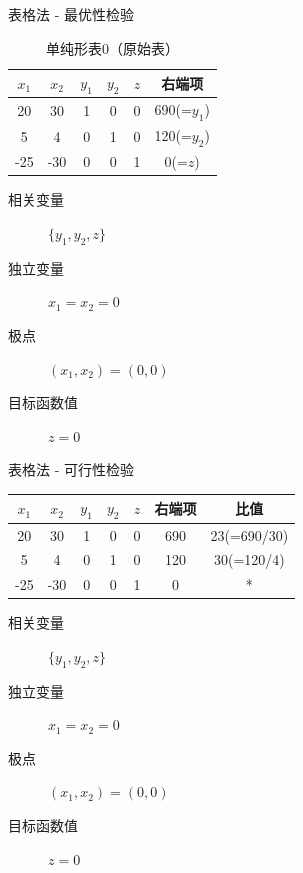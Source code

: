 \documentclass[UTF8]{ctexbeamer}
\begin{document}
\begin{frame}{表格法 - 最优性检验}

  \begin{table}
    \centering
    \begin{tabular}{|ccccc|c|}
      \hline
      $x_1$ & {\color{red}$x_2$} & $y_1$ & $y_2$ & $z$ & 右端项 \\
      \hline
      20 & 30 & 1 & 0 & 0 & 690(=$y_1$)\\
      5 & 4 & 0 & 1 & 0 & 120(=$y_2$)\\
      \hline
      -25 & {\color{red} -30} & 0 & 0 & 1 & 0(=$z$)\\
      \hline
    \end{tabular}
    \caption{单纯形表0（原始表）}
  \end{table}

  \begin{description}
  \item[相关变量] $\{y_1, y_2, z\}$
  \item[独立变量] $x_1=x_2=0$
  \item[极点] $(x_1, x_2) = (0, 0)$
  \item[目标函数值] $z = 0$
  \end{description}

\end{frame}

\begin{frame}{表格法 - 可行性检验}

  \begin{table}
    \centering
    \begin{tabular}{|ccccc|c|c|}
      \hline
      $x_1$ & {\color{red} $x_2$} & $y_1$ & $y_2$ & $z$ & 右端项 & 比值 \\
      \hline
      20 & 30 & 1 & 0 & 0 & 690 & {\color{green}23(=690/30)}\\
      5 & 4 & 0 & 1 & 0 & 120 & 30(=120/4)\\
      \hline
      -25 & {\color{red} -30} & 0 & 0 & 1 & 0 &*\\
      \hline
    \end{tabular}
  \end{table}

  \begin{description}
  \item[相关变量] $\{y_1, y_2, z\}$
  \item[独立变量] $x_1=x_2=0$
  \item[极点] $(x_1, x_2) = (0, 0)$
  \item[目标函数值] $z = 0$
  \end{description}

\end{frame}
\end{document}
